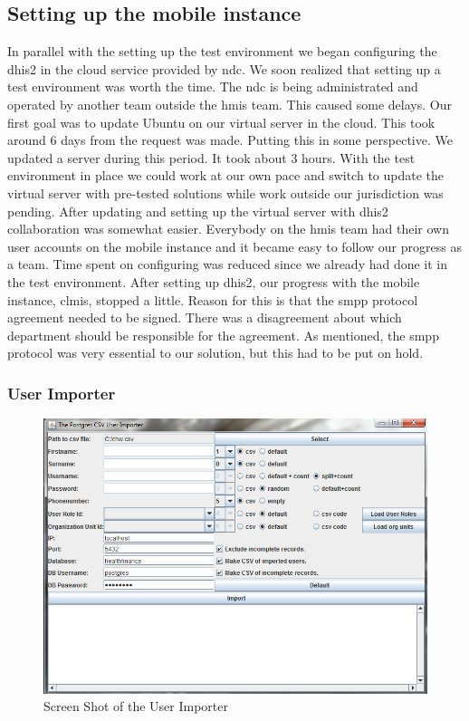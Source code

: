 \subsection{Setting up the mobile instance}
In parallel with the setting up the test environment we began configuring the \gls{dhis2} in the cloud service provided by \gls{ndc}. 
We soon realized that setting up a test environment was worth the time. 
The \gls{ndc} is being administrated and operated by another team outside the \gls{hmis} team. 
This caused some delays. Our first goal was to update Ubuntu on our virtual server in the cloud. 
This took around 6 days from the request was made. Putting this in some perspective. We updated a server during this period. It took about 3 hours. With the test environment in place we could work at our own pace and switch to update the virtual server with pre-tested solutions while work outside our jurisdiction was pending. After updating and setting up the virtual server with \gls{dhis2} collaboration was somewhat easier. Everybody on the \gls{hmis} team had their own user accounts on the mobile instance and it became easy to follow our progress as a team. Time spent on configuring was reduced since we already had done it in the test environment.
After setting up \gls{dhis2}, our progress with the mobile instance, \gls{clmis}, stopped a little. 
Reason for this is that the \gls{smpp} protocol agreement needed to be signed. There was a disagreement about which department should be responsible for the agreement. As mentioned, the \gls{smpp} protocol was very essential to our solution, but this had to be put on hold.


\subsubsection{User Importer}

\begin{figure}
\centering
\includegraphics[width=\textwidth]{case/img/userImporterScreenShot}
\caption{Screen Shot of the User Importer}
\label{fig:screenUser}
\end{figure}

